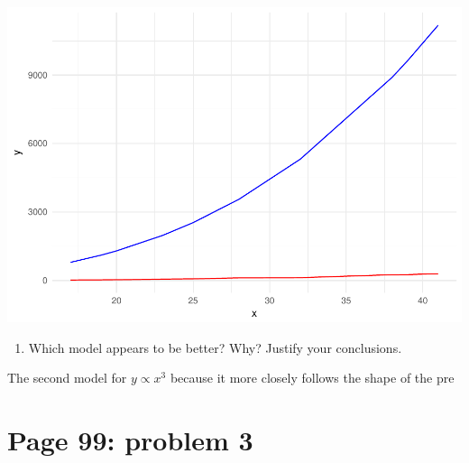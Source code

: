 \documentclass[]{article}
\newenvironment{Shaded}{\begin{snugshade}}{\end{snugshade}}
\newcommand{\KeywordTok}[1]{\textcolor[rgb]{0.13,0.29,0.53}{\textbf{{#1}}}}
\newcommand{\DataTypeTok}[1]{\textcolor[rgb]{0.13,0.29,0.53}{{#1}}}
\newcommand{\DecValTok}[1]{\textcolor[rgb]{0.00,0.00,0.81}{{#1}}}
\newcommand{\StringTok}[1]{\textcolor[rgb]{0.31,0.60,0.02}{{#1}}}
\newcommand{\NormalTok}[1]{{#1}}
\providecommand{\tightlist}{%
  \setlength{\itemsep}{0pt}\setlength{\parskip}{0pt}}
\begin{document}
\begin{Shaded}
\end{Shaded}

\includegraphics{CHunt_homework2_files/figure-latex/unnamed-chunk-4-1.pdf}

\begin{enumerate}
\def\labelenumi{\alph{enumi}.}
\setcounter{enumi}{1}
\tightlist
\item
  Which model appears to be better? Why? Justify your conclusions.
\end{enumerate}

The second model for \(y \propto x^3\) because it more closely follows
the shape of the pre

\section{Page 99: problem 3}\label{page-99-problem-3}
\end{document}
